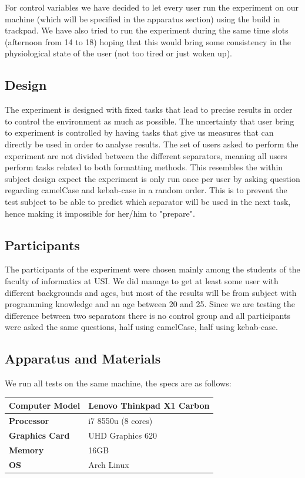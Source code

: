 \documentclass{article}
\begin{document}
For control variables we have decided to let every user run the experiment on our machine (which will be specified in the apparatus section) using 
the build in trackpad. We have also tried to run the experiment during the same time slots (afternoon from 14 to 18) hoping that this would 
bring some consistency in the physiological state of the user (not too tired or just woken up).

\subsection{Design}
The experiment is designed with fixed tasks that lead to precise results in order to control the environment as much as possible. The uncertainty that 
user bring to experiment is controlled by having tasks that give us measures that can directly be used in order to analyse results. The set of users asked to 
perform the experiment are not divided between the different separators, meaning all users perform tasks related to both formatting methods. This resembles the 
within subject design expect the experiment is only run once per user by asking question regarding camelCase and kebab-case in a random order. This is to prevent 
the test subject to be able to predict which separator will be used in the next task, hence making it impossible for her/him to "prepare".

\subsection{Participants}
The participants of the experiment were chosen mainly among the students of the faculty of informatics at USI. We did manage to get at least some user 
with different backgrounds and ages, but most of the results will be from subject with programming knowledge and an age between 20 and 25. Since we are testing the difference 
between two separators there is no control group and all participants were asked the same questions, half using camelCase, half using kebab-case.

\subsection{Apparatus and Materials}
We run all tests on the same machine, the specs are as follows:
\label{apparatus}
\begin{center}
	\begin{tabular}{ll}
		\hline
		\hline
		\textbf{Computer Model} &  Lenovo Thinkpad X1 Carbon\\
		\hline
		\textbf{Processor}      &  i7 8550u (8 cores)\\
		\textbf{Graphics Card}  &  UHD Graphics 620\\
		\textbf{Memory}         &  16GB \\
		\textbf{OS}             &  Arch Linux\\
		\hline
		\hline
	\end{tabular}
\end{center}
\end{document}
